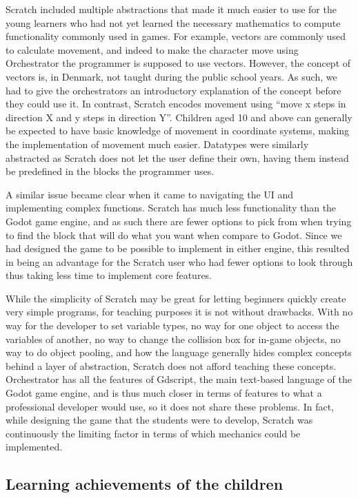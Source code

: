 Scratch included multiple abstractions that made it much easier to use for the young learners who had not yet learned the necessary mathematics to compute functionality commonly used in games.
For example, vectors are commonly used to calculate movement, and indeed to make the character move using Orchestrator the programmer is supposed to use vectors.
However, the concept of vectors is, in Denmark, not taught during the public school years.
As such, we had to give the orchestrators an introductory explanation of the concept before they could use it.
In contrast, Scratch encodes movement using “move x steps in direction X and y steps in direction Y”. Children aged 10 and above can generally be expected to have basic knowledge of movement in coordinate systems, making the implementation of movement much easier.
Datatypes were similarly abstracted as Scratch does not let the user define their own, having them instead be predefined in the blocks the programmer uses.

A similar issue became clear when it came to navigating the UI and implementing complex functions.
Scratch has much less functionality than the Godot game engine, and as such there are fewer options to pick from when trying to find the block that will do what you want when compare to Godot.
Since we had designed the game to be possible to implement in either engine, this resulted in being an advantage for the Scratch user who had fewer options to look through thus taking less time to implement core features.

While the simplicity of Scratch may be great for letting beginners quickly create very simple programs, for teaching purposes it is not
without drawbacks.
With no way for the developer to set variable types, no way for one object to access the variables of another, no way to change the collision box for in-game objects, no way to do object pooling, and how the language generally hides complex concepts behind a layer of abstraction, Scratch does not afford teaching these concepts.
Orchestrator has all the features of Gdscript, the main text-based language of the Godot game engine, and is thus much closer in terms of features to what a professional developer would use, so it does not share these problems.
In fact, while designing the game that the students were to develop, Scratch was continuously the limiting factor in terms of which mechanics could be implemented.

\subsection{Learning achievements of the children}

